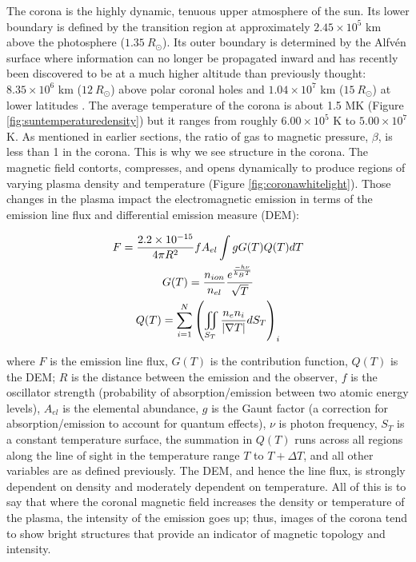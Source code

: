 The corona is the highly dynamic, tenuous upper atmosphere of the sun. Its lower boundary is defined by the transition region at approximately $2.45 \times 10^5$ km above the photosphere ($1.35\ R_\odot$). Its outer boundary is determined by the Alfv\'en surface where information can no longer be propagated inward and has recently been discovered to be at a much higher altitude than previously thought: $8.35 \times 10^6$ km ($12\ R_\odot$) above polar coronal holes and $1.04 \times 10^7$ km ($15\ R_\odot$) at lower latitudes \citep{DeForest2014}. The average temperature of the corona is about 1.5 MK (Figure \ref{fig:suntemperaturedensity}) but it ranges from roughly $6.00 \times 10^5$ K to $5.00 \times 10^7$ K. As mentioned in earlier sections, the ratio of gas to magnetic pressure, $\beta$, is less than 1 in the corona. This is why we see structure in the corona. The magnetic field contorts, compresses, and opens dynamically to produce regions of varying plasma density and temperature (Figure \ref{fig:coronawhitelight}). Those changes in the plasma impact the electromagnetic emission in terms of the emission line flux and differential emission measure (DEM): 

\begin{gather}
    \label{eq:emissionmeasure}
    F = \frac{2.2 \times 10^{-15}}{4\pi R^2}fA_{el} \int gG(T)Q(T)dT \\
    G(T) = \frac{n_{ion}}{n_{el}}\frac{e^{\frac{-h\nu}{k_BT}}}{\sqrtsign{T}} \\
    Q(T) = \sum_{i=1}^N \left(\iint_{S_T} \frac{n_e n_i}{\left|\nabla T\right|} dS_T \right)_i
\end{gather}

\noindent where $F$ is the emission line flux, $G(T)$ is the contribution function, $Q(T)$ is the DEM; $R$ is the distance between the emission and the observer, $f$ is the oscillator strength (probability of absorption/emission between two atomic energy levels), $A_{el}$ is the elemental abundance, $g$ is the Gaunt factor (a correction for absorption/emission to account for quantum effects), $\nu$ is photon frequency, $S_T$ is a constant temperature surface, the summation in $Q(T)$ runs across all regions along the line of sight in the temperature range $T$ to $T + \Delta T$, and all other variables are as defined previously. The DEM, and hence the line flux, is strongly dependent on density and moderately dependent on temperature. All of this is to say that where the coronal magnetic field increases the density or temperature of the plasma, the intensity of the emission goes up; thus, images of the corona tend to show bright structures that provide an indicator of magnetic topology and intensity. 

